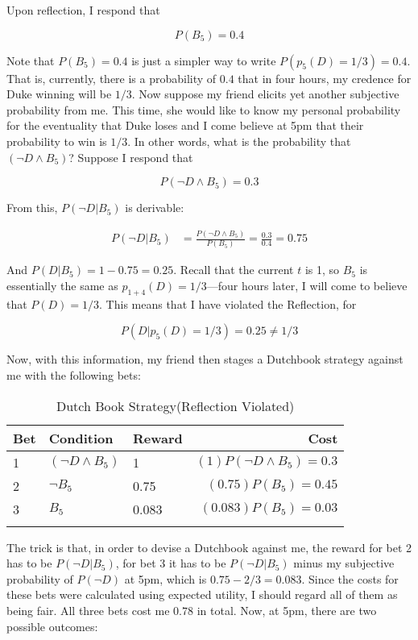Upon reflection, I respond that

\[P(B_5) = 0.4\]

Note that \(P(B_5) = 0.4\) is just a simpler way to write
\(P(p_5(D)=1/3) = 0.4\). That is, currently, there is a probability of
\(0.4\) that in four hours, my credence for Duke winning will be
\(1/3\). Now suppose my friend elicits yet another subjective
probability from me. This time, she would like to know my personal
probability for the eventuality that Duke loses and I come believe at
5pm that their probability to win is \(1/3\). In other words, what is
the probability that \((\neg D \wedge B_{5})\)? Suppose I respond that

\[P(\neg D \wedge B_{5} ) = 0.3\]

From this, \(P(\neg D|B_5)\) is derivable:

\begin{align}
P(\neg D|B_5) &= \frac{P(\neg D \wedge B_5)}{P(B_5)}= \frac{0.3}{0.4}=0.75
\end{align}

And \(P(D|B_5) = 1 - 0.75 = 0.25\). Recall that the current \(t\) is 1,
so \(B_5\) is essentially the same as \(p_{1+4}(D) = 1/3\)---four hours
later, I will come to believe that \(P(D)=1/3\). This means that I have
violated the Reflection, for

\[P(D|p_{5}(D) = 1/3)=0.25 \neq 1/3\]

Now, with this information, my friend then stages a Dutchbook strategy
against me with the following bets:

\begin{longtable}[]{@{}lllr@{}}
\toprule
Bet & Condition & Reward & Cost\tabularnewline
\midrule
\endhead
1 & \((\neg D \wedge B_5)\) & 1 &
\((1)P(\neg D \wedge B_5) =0.3\)\tabularnewline
2 & \(\neg B_5\) & 0.75 & \((0.75)P(B_5)=0.45\)\tabularnewline
3 & \(B_5\) & 0.083 & \((0.083)P(B_5) = 0.03\)\tabularnewline
\bottomrule
\caption{Dutch Book Strategy(Reflection Violated)}
\label{tab:reflectiondutchbooksureloss}
\end{longtable}

The trick is that, in order to devise a Dutchbook against me, the reward
for bet 2 has to be \(P(\neg D | B_5)\), for bet 3 it has to be
\(P(\neg D | B_5)\) minus my subjective probability of \(P(\neg D)\) at
5pm, which is \(0.75-2/3= 0.083\). Since the costs for these bets were
calculated using expected utility, I should regard all of them as being
fair. All three bets cost me \(0.78\) in total. Now, at 5pm, there are
two possible outcomes:

